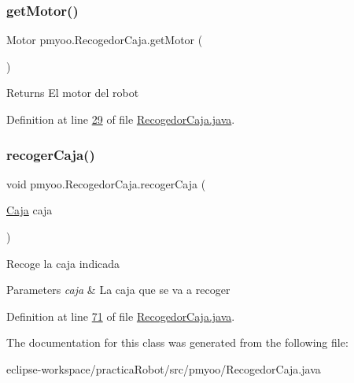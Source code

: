\subsubsection{\texorpdfstring{getMotor()}{getMotor()}}
{\footnotesize\ttfamily Motor pmyoo.\+Recogedor\+Caja.\+get\+Motor (\begin{DoxyParamCaption}{ }\end{DoxyParamCaption})}

\begin{DoxyReturn}{Returns}
El motor del robot 
\end{DoxyReturn}


Definition at line \mbox{\hyperlink{_recogedor_caja_8java_source_l00029}{29}} of file \mbox{\hyperlink{_recogedor_caja_8java_source}{Recogedor\+Caja.\+java}}.

\mbox{\label{classpmyoo_1_1_recogedor_caja_af00b81c904386ff1758a3afde032baec}} 
\subsubsection{\texorpdfstring{recogerCaja()}{recogerCaja()}}
{\footnotesize\ttfamily void pmyoo.\+Recogedor\+Caja.\+recoger\+Caja (\begin{DoxyParamCaption}\item[{\mbox{\hyperlink{classpmyoo_1_1_caja}{Caja}}}]{caja }\end{DoxyParamCaption})}

Recoge la caja indicada 
\begin{DoxyParams}{Parameters}
{\em caja} & La caja que se va a recoger \\
\hline
\end{DoxyParams}


Definition at line \mbox{\hyperlink{_recogedor_caja_8java_source_l00071}{71}} of file \mbox{\hyperlink{_recogedor_caja_8java_source}{Recogedor\+Caja.\+java}}.



The documentation for this class was generated from the following file\+:\begin{DoxyCompactItemize}
\item 
eclipse-\/workspace/practica\+Robot/src/pmyoo/Recogedor\+Caja.\+java\end{DoxyCompactItemize}
